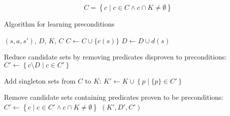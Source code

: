 \documentclass[../../Master.tex]{subfiles}
\begin{document}
\begin{equation} \label{eq:removeKnown}
    C = \left\{ c \; | \; c \in C \land c \cap K \neq \emptyset \right\}
\end{equation}

\begin{algorithm}
    \caption{Algorithm for learning preconditions}\label{algo:precondLearn}
    \begin{algorithmic}
         {$\left( s, a, s'\right)$, $D$, $K$, $C$}
                \State $C \gets C \cup \{ c(s) \}$
                \State $D \gets D \cup d(s)$
            \EndIf

            \State Reduce candidate sets by removing predicates disproven to preconditions:
            \State $C' \gets \left\{ c \setminus D \; | \; c \in C' \right\}$

            \State Add singleton sets from $C$ to $K$:
            \State $K' \gets K \cup \left\{ p \; | \; \{ p \} \in C' \right\}$

            \State Remove candidate sets containing predicates proven to be preconditions:
            \State $C' \gets \left\{ c \; | \; c \in C' \land c \cap K \neq \emptyset \right\}$
            \State \Return $(K', D', C')$
        \EndFunction%
    \end{algorithmic}
\end{algorithm}
\end{document}
